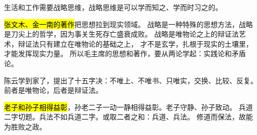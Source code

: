 生活和工作需要战略思维，战略思维是可以学而知之、学而时习之的。

\hl{张文木、金一南的著作}把思想拉到现实领域。
战略是一种特殊的思想方法，战略是刀尖上的哲学，因为事关生死存亡盛衰成败。
战略是唯物论之上的辩证法艺术，辩证法只有建立在唯物论的基础之上，
才不是玄学，扎根于现实的土壤里，才能发挥现实力量。
所以毛主席的思想和著作，要从两论学起：实践论和矛盾论。

陈云学到家了，提出了十五字决：不唯上、不唯书、只唯实，交换、比较、反复。
前者是唯物论，后者是辩证法。

\hl{老子和孙子相得益彰}，孙老二子一动一静相得益彰。老子守静、孙子致动。
兵道二字切题。兵法不如兵道二字。或取二者之和：兵道、兵法。
修道而保法，故能为胜败之政。

\hrulefill

\hrulefill

